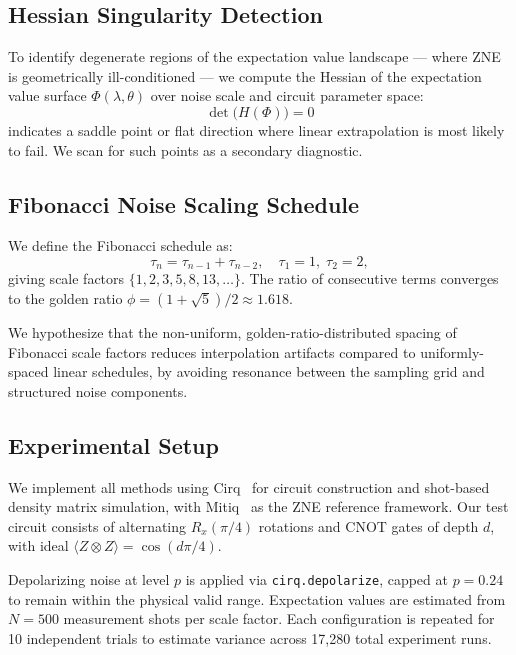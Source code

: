\documentclass[twocolumn,showpacs,preprintnumbers,amsmath,amssymb,prl]{revtex4-2}
\begin{document}
\subsection{Hessian Singularity Detection}
\label{subsec:hessian}

To identify degenerate regions of the expectation value landscape — where
ZNE is geometrically ill-conditioned — we compute the Hessian of the
expectation value surface $\Phi(\lambda, \theta)$ over noise scale and
circuit parameter space:
\begin{equation}
    \det\bigl(H(\Phi)\bigr) = 0
    \label{eq:hessian}
\end{equation}
indicates a saddle point or flat direction where linear extrapolation is
most likely to fail. We scan for such points as a secondary diagnostic.

\subsection{Fibonacci Noise Scaling Schedule}
\label{subsec:fibonacci}

We define the Fibonacci schedule as:
\begin{equation}
    \tau_n = \tau_{n-1} + \tau_{n-2},
    \quad \tau_1 = 1,\; \tau_2 = 2,
    \label{eq:fibonacci}
\end{equation}
giving scale factors $\{1, 2, 3, 5, 8, 13, \ldots\}$. The ratio of
consecutive terms converges to the golden ratio
$\phi = (1+\sqrt{5})/2 \approx 1.618$.

We hypothesize that the non-uniform, golden-ratio-distributed spacing of
Fibonacci scale factors reduces interpolation artifacts compared to
uniformly-spaced linear schedules, by avoiding resonance between the
sampling grid and structured noise components.

\subsection{Experimental Setup}
\label{subsec:setup}

We implement all methods using Cirq~\cite{Cirq2023} for circuit
construction and shot-based density matrix simulation, with
Mitiq~\cite{LaRose2022} as the ZNE reference framework. Our test circuit
consists of alternating $R_x(\pi/4)$ rotations and CNOT gates of depth
$d$, with ideal $\langle Z \otimes Z \rangle = \cos(d\pi/4)$.

Depolarizing noise at level $p$ is applied via \texttt{cirq.depolarize},
capped at $p = 0.24$ to remain within the physical valid range.
Expectation values are estimated from $N = 500$ measurement shots
per scale factor. Each configuration is repeated for 10 independent
trials to estimate variance across 17,280 total experiment runs.
\end{document}
